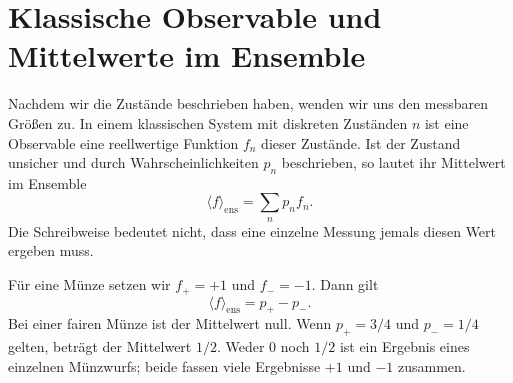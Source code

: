\begin{classroomqa}\end{classroomqa}

\section{Klassische Observable und Mittelwerte im Ensemble}

Nachdem wir die Zustände beschrieben haben, wenden wir uns den messbaren Größen zu. In einem klassischen System mit diskreten Zuständen \(n\) ist eine Observable eine reellwertige Funktion \(f_n\) dieser Zustände. Ist der Zustand unsicher und durch Wahrscheinlichkeiten \(p_n\) beschrieben, so lautet ihr Mittelwert im Ensemble
\begin{equation}
  \langle f\rangle_{\mathrm{ens}}
  =\sum_n p_n f_n.
  \label{eq:l02-classical-expectation}
\end{equation}
Die Schreibweise bedeutet nicht, dass eine einzelne Messung jemals diesen Wert ergeben muss.

Für eine Münze setzen wir \(f_+=+1\) und \(f_-=-1\). Dann gilt
\begin{equation}
  \langle f\rangle_{\mathrm{ens}}
  =p_+-p_-.
  \label{eq:l02-coin-expectation}
\end{equation}
Bei einer fairen Münze ist der Mittelwert null. Wenn \(p_+=3/4\) und \(p_-=1/4\) gelten, beträgt der Mittelwert \(1/2\). Weder \(0\) noch \(1/2\) ist ein Ergebnis eines einzelnen Münzwurfs; beide fassen viele Ergebnisse \(+1\) und \(-1\) zusammen.

\begin{classroomqa}\end{classroomqa}

